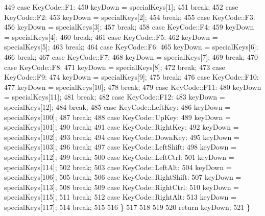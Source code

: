 \begin{DoxyCode}
449     \textcolor{keywordflow}{case} KeyCode::F1:
450         keyDown = specialKeys[1];
451         \textcolor{keywordflow}{break};
452     \textcolor{keywordflow}{case} KeyCode::F2:
453         keyDown = specialKeys[2];
454         \textcolor{keywordflow}{break};
455     \textcolor{keywordflow}{case} KeyCode::F3:
456         keyDown = specialKeys[3];
457         \textcolor{keywordflow}{break};
458     \textcolor{keywordflow}{case} KeyCode::F4:
459         keyDown = specialKeys[4];
460         \textcolor{keywordflow}{break};
461     \textcolor{keywordflow}{case} KeyCode::F5:
462         keyDown = specialKeys[5];
463         \textcolor{keywordflow}{break};
464     \textcolor{keywordflow}{case} KeyCode::F6:
465         keyDown = specialKeys[6];
466         \textcolor{keywordflow}{break};
467     \textcolor{keywordflow}{case} KeyCode::F7:
468         keyDown = specialKeys[7];
469         \textcolor{keywordflow}{break};
470     \textcolor{keywordflow}{case} KeyCode::F8:
471         keyDown = specialKeys[8];
472         \textcolor{keywordflow}{break};
473     \textcolor{keywordflow}{case} KeyCode::F9:
474         keyDown = specialKeys[9];
475         \textcolor{keywordflow}{break};
476     \textcolor{keywordflow}{case} KeyCode::F10:
477         keyDown = specialKeys[10];
478         \textcolor{keywordflow}{break};
479     \textcolor{keywordflow}{case} KeyCode::F11:
480         keyDown = specialKeys[11];
481         \textcolor{keywordflow}{break};
482     \textcolor{keywordflow}{case} KeyCode::F12:
483         keyDown = specialKeys[12];
484         \textcolor{keywordflow}{break};
485     \textcolor{keywordflow}{case} KeyCode::LeftKey:
486         keyDown = specialKeys[100];
487         \textcolor{keywordflow}{break};
488     \textcolor{keywordflow}{case} KeyCode::UpKey:
489         keyDown = specialKeys[101];
490         \textcolor{keywordflow}{break};
491     \textcolor{keywordflow}{case} KeyCode::RightKey:
492         keyDown = specialKeys[102];
493         \textcolor{keywordflow}{break};
494     \textcolor{keywordflow}{case} KeyCode::DownKey:
495         keyDown = specialKeys[103];
496         \textcolor{keywordflow}{break};
497     \textcolor{keywordflow}{case} KeyCode::LeftShift:
498         keyDown = specialKeys[112];
499         \textcolor{keywordflow}{break};
500     \textcolor{keywordflow}{case} KeyCode::LeftCtrl:
501         keyDown = specialKeys[114];
502         \textcolor{keywordflow}{break};
503     \textcolor{keywordflow}{case} KeyCode::LeftAlt:
504         keyDown = specialKeys[106];
505         \textcolor{keywordflow}{break};
506     \textcolor{keywordflow}{case} KeyCode::RightShift:
507         keyDown = specialKeys[113];
508         \textcolor{keywordflow}{break};
509     \textcolor{keywordflow}{case} KeyCode::RightCtrl:
510         keyDown = specialKeys[115];
511         \textcolor{keywordflow}{break};
512     \textcolor{keywordflow}{case} KeyCode::RightAlt:
513         keyDown = specialKeys[117];
514         \textcolor{keywordflow}{break};
515 
516         \}
517     
518 
519 
520     \textcolor{keywordflow}{return} keyDown;
521 \}
\end{DoxyCode}


